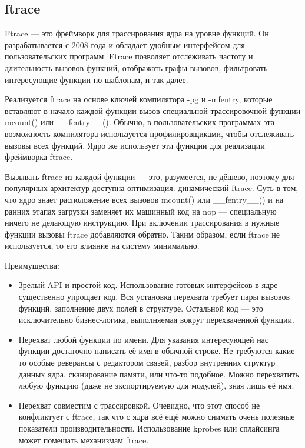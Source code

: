 	\subsection{ftrace}
Ftrace — это фреймворк для трассирования ядра на уровне функций. Он разрабатывается с 2008 года и обладает удобным интерфейсом для пользовательских программ. Ftrace позволяет отслеживать частоту и длительность вызовов функций, отображать графы вызовов, фильтровать интересующие функции по шаблонам, и так далее.

Реализуется ftrace на основе ключей компилятора -pg и -mfentry, которые вставляют в начало каждой функции вызов специальной трассировочной функции mcount() или \_\_fentry\_\_(). Обычно, в пользовательских программах эта возможность компилятора используется профилировщиками, чтобы отслеживать вызовы всех функций. Ядро же использует эти функции для реализации фреймворка ftrace.

Вызывать ftrace из каждой функции — это, разумеется, не дёшево, поэтому для популярных архитектур доступна оптимизация: динамический ftrace. Суть в том, что ядро знает расположение всех вызовов mcount() или \_\_fentry\_\_() и на ранних этапах загрузки заменяет их машинный код на nop — специальную ничего не делающую инструкцию. При включении трассирования в нужные функции вызовы ftrace добавляются обратно. Таким образом, если ftrace не используется, то его влияние на систему минимально.

Преимущества:
\begin{itemize}
	\item Зрелый API и простой код. Использование готовых интерфейсов в ядре существенно упрощает код. Вся установка перехвата требует пары вызовов функций, заполнение двух полей в структуре. Остальной код — это исключительно бизнес-логика, выполняемая вокруг перехваченной функции.
	\item Перехват любой функции по имени. Для указания интересующей нас функции достаточно написать её имя в обычной строке. Не требуются какие-то особые реверансы с редактором связей, разбор внутренних структур данных ядра, сканирование памяти, или что-то подобное. Можно перехватить любую функцию (даже не экспортируемую для модулей), зная лишь её имя.
	\item Перехват совместим с трассировкой. Очевидно, что этот способ не конфликтует с ftrace, так что с ядра всё ещё можно снимать очень полезные показатели производительности. Использование kprobes или сплайсинга может помешать механизмам ftrace.
\end{itemize}

